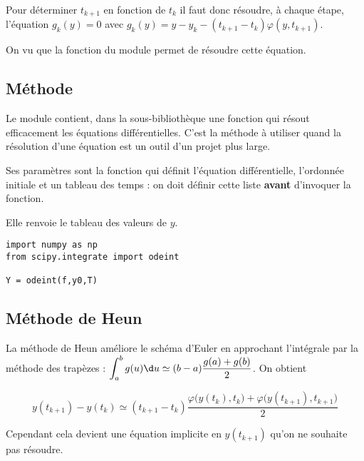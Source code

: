 Pour déterminer $t_{k+1}$ en fonction de $t_k$ il faut donc résoudre, à chaque étape, l'équation $g_k(y)=0$ avec $g_k(y)= y-y_k - (t_{k+1}-t_k) \varphi(y,t_{k+1})$.

On vu que la fonction  du module  permet de résoudre cette équation.
\newpage
\subsection{Méthode }
Le module  contient, dans la sous-bibliothèque  une fonction  qui résout efficacement les équations différentielles. C'est la méthode à utiliser quand la résolution d'une équation est un outil d'un projet plus large.

Ses paramètres sont la fonction qui définit l'équation différentielle, l'ordonnée initiale et un tableau des temps : on doit définir cette liste {\bf avant} d'invoquer la fonction.

Elle renvoie le tableau des valeurs de $y$.
\begin{lstlisting}
import numpy as np
from scipy.integrate import odeint

Y = odeint(f,y0,T)
\end{lstlisting}
\subsection{Méthode de Heun}
La méthode de Heun améliore le schéma d'Euler en approchant l'intégrale par la méthode des trapèzes : $\displaystyle \int_{a}^b g(u) \d u\simeq (b-a)\frac{g(a)+g(b)}2$. On obtient

\[ y(t_{k+1})-y(t_k)\simeq  (t_{k+1}-t_k) \frac {\varphi\bigl(y(t_k),t_k\bigr)+\varphi\bigl(y(t_{k+1}),t_{k+1}\bigr)}2 \]

Cependant cela devient une équation implicite en $y(t_{k+1})$ qu'on ne souhaite pas résoudre.

